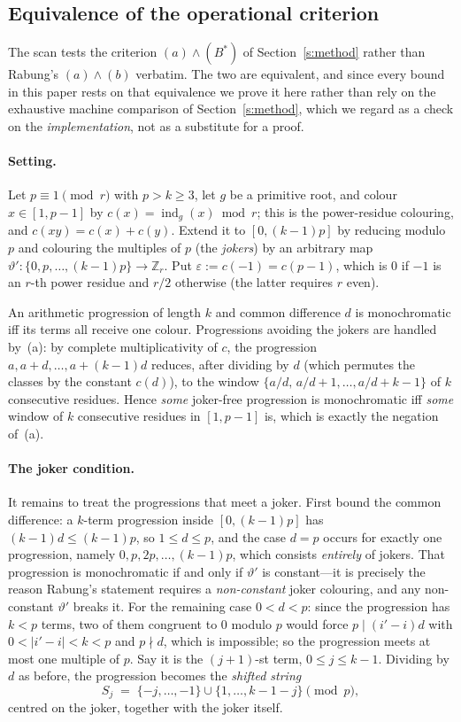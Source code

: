 \subsection{Equivalence of the operational criterion}\label{s:bstar}

The scan tests the criterion $(a)\wedge(B^{*})$ of Section~\ref{s:method} rather
than Rabung's $(a)\wedge(b)$ verbatim. The two are equivalent, and since every
bound in this paper rests on that equivalence we prove it here rather than rely
on the exhaustive machine comparison of Section~\ref{s:method}, which we regard
as a check on the \emph{implementation}, not as a substitute for a proof.

\paragraph{Setting.}
Let $p\equiv1\pmod r$ with $p>k\ge3$, let $g$ be a primitive root, and colour $x\in[1,p-1]$ by
$c(x)=\operatorname{ind}_g(x)\bmod r$; this is the power-residue colouring, and
$c(xy)=c(x)+c(y)$. Extend it to $[0,(k-1)p]$ by reducing modulo $p$ and colouring
the multiples of $p$ (the \emph{jokers}) by an arbitrary map
$\vartheta':\{0,p,\dots,(k-1)p\}\to\mathbb{Z}_r$. Put
$\varepsilon:=c(-1)=c(p-1)$,
which is $0$ if $-1$ is an $r$-th power residue and $r/2$ otherwise (the latter
requires $r$ even).

An arithmetic progression of length $k$ and common difference $d$ is monochromatic
iff its terms all receive one colour. Progressions avoiding the jokers are handled
by~(a): by complete multiplicativity of $c$, the progression $a,a+d,\dots,a+(k-1)d$
reduces, after dividing by $d$ (which permutes the classes by the constant
$c(d)$), to the window $\{a/d,\,a/d+1,\dots,a/d+k-1\}$ of $k$ consecutive
residues. Hence \emph{some} joker-free progression is monochromatic iff \emph{some}
window of $k$ consecutive residues in $[1,p-1]$ is, which is exactly the negation
of~(a).

\paragraph{The joker condition.}
It remains to treat the progressions that meet a joker. First bound the common
difference: a $k$-term progression inside $[0,(k-1)p]$ has
$(k-1)d\le(k-1)p$, so $1\le d\le p$, and the case $d=p$ occurs for exactly one
progression, namely $0,p,2p,\dots,(k-1)p$, which consists \emph{entirely} of
jokers. That progression is monochromatic if and only if $\vartheta'$ is
constant---it is precisely the reason Rabung's statement requires a
\emph{non-constant} joker colouring, and any non-constant $\vartheta'$ breaks
it. For the remaining case $0<d<p$: since the progression has $k<p$ terms, two
of them congruent to $0$ modulo $p$ would force $p\mid(i'-i)d$ with
$0<|i'-i|<k<p$ and $p\nmid d$, which is impossible; so the progression meets at
most one multiple of $p$. Say it is the $(j+1)$-st term, $0\le j\le k-1$.
Dividing by $d$ as before, the progression becomes the \emph{shifted string}
\[
  S_j \;=\; \{-j,\dots,-1\}\cup\{1,\dots,k-1-j\}\pmod p,
\]
centred on the joker, together with the joker itself.

